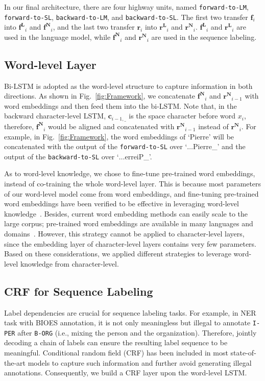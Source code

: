 \documentclass[letterpaper]{article} \usepackage{aaai18}  \usepackage{times}  \usepackage{helvet}  \usepackage{courier}  \usepackage{url}  \usepackage{graphicx}  \usepackage{multirow}
\def \myspace {\_}
\def \c {\mathbf{c}}
\def \f {\mathbf{f}}
\def \r {\mathbf{r}}
\def \fl {\mathbf{f^{L}}}
\def \fw {\mathbf{f^{N}}}
\def \rl {\mathbf{r^{L}}}
\def \rw {\mathbf{r^{N}}}
\begin{document}
In our final architecture, there are four highway units, named \texttt{forward-to-LM}, \texttt{forward-to-SL}, \texttt{backward-to-LM}, and \texttt{backward-to-SL}.
The first two transfer $\f_i$ into $\fl_i$ and $\fw_i$, and the last two transfer $\r_i$ into $\rl_i$ and $\rw_i$.
$\fl_i$ and $\rl_i$ are used in the language model, while $\fw_i$ and $\rw_i$ are used in the sequence labeling.

\subsection{Word-level Layer}

Bi-LSTM is adopted as the word-level structure to capture information in both directions.
As shown in Fig.~\ref{fig:Framework}, we concatenate $\fw_i$ and $\rw_{i-1}$ with word embeddings and then feed them into the bi-LSTM.
Note that, in the backward character-level LSTM, $\c_{i-1, \myspace}$ is the space character before word $x_{i}$, therefore, $\fw_i$ would be aligned and concatenated with $\rw_{i-1}$ instead of $\rw_{i}$.
For example, in Fig.~\ref{fig:Framework}, the word embeddings of `Pierre' will be concatenated with the output of the \texttt{forward-to-SL} over `$\ldots$Pierre\myspace' and the output of the \texttt{backward-to-SL} over `$\ldots$erreiP\myspace'.

As to word-level knowledge, we chose to fine-tune pre-trained word embeddings, instead of co-training the whole word-level layer.
This is because most parameters of our word-level model come from word embeddings, and fine-tuning pre-trained word embeddings have been verified to be effective in leveraging word-level knowledge~\cite{ma-hovy:2016:P16-1}.
Besides, current word embedding methods can easily scale to the large corpus; pre-trained word embeddings are available in many languages and domains~\cite{fernandezvecshare}.
However, this strategy cannot be applied to character-level layers, since the embedding layer of character-level layers contains very few parameters.
Based on these considerations, we applied different strategies to leverage word-level knowledge from character-level.

\subsection{CRF for Sequence Labeling}

Label dependencies are crucial for sequence labeling tasks.
For example, in NER task with BIOES annotation, it is not only meaningless but illegal to annotate \texttt{I-PER} after \texttt{B-ORG} (i.e., mixing the person and the organization).
Therefore, jointly decoding a chain of labels can ensure the resulting label sequence to be meaningful.
Conditional random field (CRF) has been included in most state-of-the-art models to capture such information and further avoid generating illegal annotations.
Consequently, we build a CRF layer upon the word-level LSTM.
\end{document}
